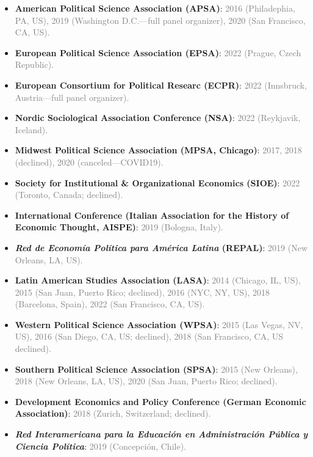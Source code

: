 \begin{itemize}
\item[\textcolor{gray}{\textbullet}] {\bf American Political Science Association (APSA)}: \textcolor{gray}{2016 (Philadephia, PA, US), 2019 (Washington D.C.---full panel organizer), 2020 (San Francisco, CA, US).}
\item[\textcolor{gray}{\textbullet}] {\bf European Political Science Association (EPSA)}: \textcolor{gray}{2022 (Prague, Czech Republic).}
\item[\textcolor{gray}{\textbullet}] {\bf European Consortium for Political Researc (ECPR)}: \textcolor{gray}{2022 (Innsbruck, Austria---full panel organizer).}
\item[\textcolor{gray}{\textbullet}] {\bf Nordic Sociological Association Conference (NSA)}: \textcolor{gray}{2022 (Reykjavik, Iceland).}
\item[\textcolor{gray}{\textbullet}] {\bf Midwest Political Science Association (MPSA, Chicago)}: \textcolor{gray}{2017, 2018 (declined), 2020 (canceled---COVID19).}
\item[\textcolor{gray}{\textbullet}] {\bf Society for Institutional \& Organizational Economics (SIOE)}: \textcolor{gray}{2022 (Toronto, Canada; declined).}
\item[\textcolor{gray}{\textbullet}] {\bf International Conference (Italian Association for the History of Economic Thought, AISPE)}: \textcolor{gray}{2019 (Bologna, Italy).}
\item[\textcolor{gray}{\textbullet}] {\bf \emph{Red de Econom\'ia Pol\'itica para Am\'erica Latina} (REPAL)}: \textcolor{gray}{2019 (New Orleans, LA, US).}
\item[\textcolor{gray}{\textbullet}] {\bf Latin American Studies Association (LASA)}: \textcolor{gray}{2014 (Chicago, IL, US), 2015 (San Juan, Puerto Rico; declined), 2016 (NYC, NY, US), 2018 (Barcelona, Spain), 2022 (San Francisco, CA, US).}
\item[\textcolor{gray}{\textbullet}] {\bf Western Political Science Association (WPSA)}: \textcolor{gray}{2015 (Las Vegas, NV, US), 2016 (San Diego, CA, US; declined), 2018 (San Francisco, CA, US declined).}
\item[\textcolor{gray}{\textbullet}] {\bf Southern Political Science Association (SPSA)}: \textcolor{gray}{2015 (New Orleans), 2018 (New Orleans, LA, US), 2020 (San Juan, Puerto Rico; declined).}
\item[\textcolor{gray}{\textbullet}] {\bf Development Economics and Policy Conference (German Economic Association)}: \textcolor{gray}{2018 (Zurich, Switzerland; declined).}
\item[\textcolor{gray}{\textbullet}] {\bf \emph{Red Interamericana para la Educaci\'on en Administraci\'on P\'ublica y Ciencia Pol\'itica}}: \textcolor{gray}{2019 (Concepci\'on, Chile).}
\end{itemize}
